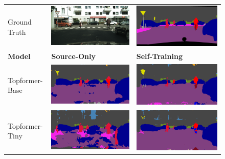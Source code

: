 \documentclass[a4paper,12pt]{report}
\begin{document}
\begin{figure}[]
    \centering
    \begin{tabular}{lll}
        Ground Truth       & \includegraphics[width=.3\linewidth,valign=m]{res/lightweight-uda-baseline-qualitative/image.png}                         & \includegraphics[width=.3\linewidth,valign=m]{res/lightweight-uda-baseline-qualitative/ground-truth.png}                    \\
        \textbf{Model}     & \textbf{Source-Only}                                                                                                      & \textbf{Self-Training}                                                                                                      \\
        Topformer-Base     & \includegraphics[width=.3\linewidth,valign=m]{res/lightweight-uda-baseline-qualitative/topformer-base-sourceonly.png}     & \includegraphics[width=.3\linewidth,valign=m]{res/lightweight-uda-baseline-qualitative/topformer-base-selftraining.png}     \\
        Topformer-Tiny     & \includegraphics[width=.3\linewidth,valign=m]{res/lightweight-uda-baseline-qualitative/topformer-tiny-sourceonly.png}     & \includegraphics[width=.3\linewidth,valign=m]{res/lightweight-uda-baseline-qualitative/topformer-tiny-selftraining.png}     \\

\end{tabular}
\end{figure}
\end{document}
